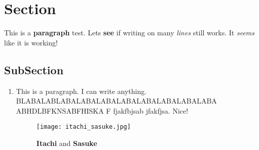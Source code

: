 \documentclass[12pt,]{article}
\begin{document}
	\section*{Section}

		This is a \textbf{paragraph} test. Lets \textbf{see} if writing on many \textit{lines} still works. It \textit{seems} like it is working!

		\subsection{SubSection}

			\begin{enumerate}

				\item
				This is a paragraph. I can write anything. BLABALABLABALABALABALABALABALABALABALABA ABHDLBFKNSABFHISKA F fjakfbjsab jfakfjsa. Nice!

				\begin{figure}[H]
					\centering
					\texttt{[image: itachi\_sasuke.jpg]}
					\caption{\textbf{Itachi} and \textbf{Sasuke}}
				\end{figure}

			\end{enumerate}
\end{document}
